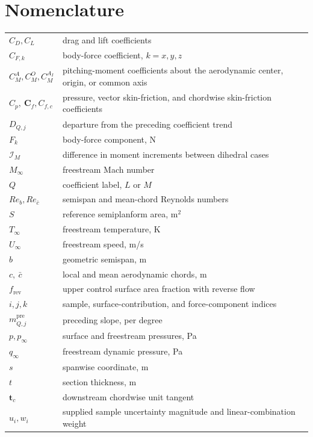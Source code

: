 \documentclass[journal]{new-aiaa}
\begin{document}
\section*{Nomenclature}
\begin{longtable*}{@{}l@{\quad=\quad}>{\raggedright\arraybackslash}p{.77\linewidth}@{}}
$C_D,C_L$ & drag and lift coefficients \\
$C_{F,k}$ & body-force coefficient, $k=x,y,z$ \\
$C_M^A,C_M^O,C_M^{A_I}$ & pitching-moment coefficients about the aerodynamic center, origin, or common axis \\
$C_p,\ \mathbf C_f,C_{f,c}$ & pressure, vector skin-friction, and chordwise skin-friction coefficients \\
$D_{Q,j}$ & departure from the preceding coefficient trend \\
$F_k$ & body-force component, N \\
$\mathcal I_M$ & difference in moment increments between dihedral cases \\
$M_\infty$ & freestream Mach number \\
$Q$ & coefficient label, $L$ or $M$ \\
$Re_b,Re_{\bar c}$ & semispan and mean-chord Reynolds numbers \\
$S$ & reference semiplanform area, m$^2$ \\
$T_\infty$ & freestream temperature, K \\
$U_\infty$ & freestream speed, m/s \\
$b$ & geometric semispan, m \\
$c,\ \bar c$ & local and mean aerodynamic chords, m \\
$f_{\mathrm{rev}}$ & upper control surface area fraction with reverse flow \\
$i,j,k$ & sample, surface-contribution, and force-component indices \\
$m_{Q,j}^{\mathrm{pre}}$ & preceding slope, per degree \\
$p,p_\infty$ & surface and freestream pressures, Pa \\
$q_\infty$ & freestream dynamic pressure, Pa \\
$s$ & spanwise coordinate, m \\
$t$ & section thickness, m \\
$\mathbf t_c$ & downstream chordwise unit tangent \\
$u_i,w_i$ & supplied sample uncertainty magnitude and linear-combination weight \\

\end{longtable*}
\end{document}
